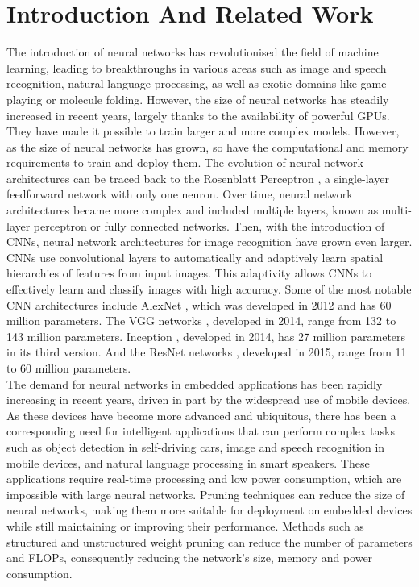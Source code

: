 \section{Introduction And Related Work}
The introduction of neural networks has revolutionised the field of machine
learning, leading to breakthroughs in various areas such as image and speech
recognition, natural language processing, as well as exotic domains like game
playing or molecule folding. However, the size of neural networks has steadily
increased in recent years, largely thanks to the availability of powerful
\acp{GPU}. They have made it possible to train larger and more complex models.
However, as the size of neural networks has grown, so have the computational and
memory requirements to train and deploy them. The evolution of neural network
architectures can be traced back to the Rosenblatt Perceptron
\cite{rosenblatt1958perceptron}, a single-layer feedforward network with only
one neuron. Over time, neural network architectures became more complex and
included multiple layers, known as multi-layer perceptron or fully connected
networks. Then, with the introduction of \acp{CNN}, neural network architectures
for image recognition have grown even larger. \acp{CNN} use
convolutional layers to automatically and adaptively learn spatial hierarchies
of features from input images. This adaptivity allows \acp{CNN} to effectively
learn and classify images with high accuracy. Some of the most notable \ac{CNN}
architectures include AlexNet \cite{DBLP:conf/nips/KrizhevskySH12}, which was
developed in 2012 and has 60 million parameters. The VGG networks
\cite{DBLP:journals/corr/SimonyanZ14a}, developed in 2014, range from 132 to 143
million parameters. Inception \cite{DBLP:conf/cvpr/SzegedyLJSRAEVR15}, developed
in 2014, has 27 million parameters in its third version. And the ResNet networks
\cite{DBLP:conf/cvpr/HeZRS16}, developed in 2015, range from 11 to 60
million parameters. \\

The demand for neural networks in embedded applications has been rapidly
increasing in recent years, driven in part by the widespread use of mobile
devices. As these devices have become more advanced and ubiquitous, there has
been a corresponding need for intelligent applications that can perform complex
tasks such as object detection in self-driving cars, image and speech
recognition in mobile devices, and natural language processing in smart
speakers. These applications require real-time processing and low power
consumption, which are impossible with large neural networks. Pruning techniques
can reduce the size of neural networks, making them more suitable for deployment
on embedded devices while still maintaining or improving their performance.
Methods such as structured and unstructured weight pruning can reduce the number
of parameters and \acp{FLOP}, consequently reducing the network's size, memory
and power consumption.\\



